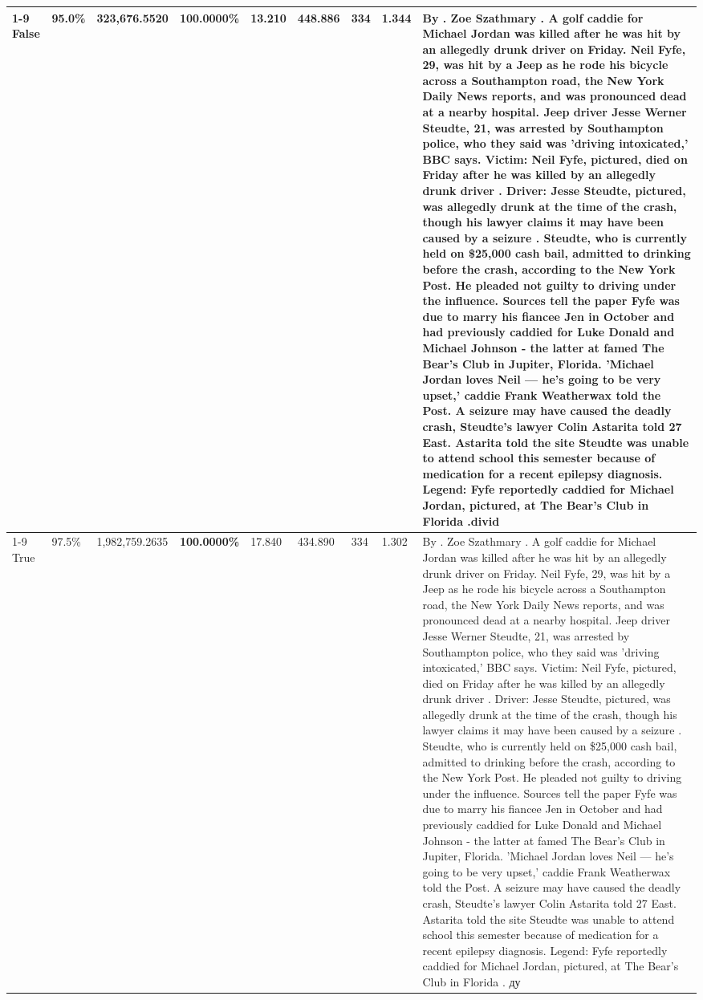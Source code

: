 \begin{table}[H]
\begin{tabular}{lllrlllll}
\cline{1-9}
False & 95.0\% & 323,676.5520 & \bfseries \color{red} 100.0000\% & 13.210 & 448.886 & 334 & 1.344 & By . Zoe Szathmary . A golf caddie for Michael Jordan was killed after he was hit by an allegedly drunk driver on Friday. Neil Fyfe, 29, was hit by a Jeep as he rode his bicycle across a Southampton road, the New York Daily News reports, and was pronounced dead at a nearby hospital. Jeep driver Jesse Werner Steudte, 21, was arrested by Southampton police, who they said was 'driving intoxicated,' BBC says. Victim: Neil Fyfe, pictured, died on Friday after he was killed by an allegedly drunk driver . Driver: Jesse Steudte, pictured, was allegedly drunk at the time of the crash, though his lawyer claims it may have been caused by a seizure . Steudte, who is currently held on \$25,000 cash bail, admitted to drinking before the crash, according to the New York Post. He pleaded not guilty to driving under the influence. Sources tell the paper Fyfe was due to marry his fiancee Jen in October and had previously caddied for Luke Donald and Michael Johnson - the latter at famed The Bear's Club in Jupiter, Florida. 'Michael Jordan loves Neil — he’s going to be very upset,' caddie Frank Weatherwax told the Post. A seizure may have caused the deadly crash, Steudte's lawyer Colin Astarita told 27 East. Astarita told the site Steudte was unable to attend school this semester because of medication for a recent epilepsy diagnosis. Legend: Fyfe reportedly caddied for Michael Jordan, pictured, at The Bear's Club in Florida .divid \\
\cline{1-9}
True & 97.5\% & 1,982,759.2635 & \bfseries \color{red} 100.0000\% & 17.840 & 434.890 & 334 & 1.302 & By . Zoe Szathmary . A golf caddie for Michael Jordan was killed after he was hit by an allegedly drunk driver on Friday. Neil Fyfe, 29, was hit by a Jeep as he rode his bicycle across a Southampton road, the New York Daily News reports, and was pronounced dead at a nearby hospital. Jeep driver Jesse Werner Steudte, 21, was arrested by Southampton police, who they said was 'driving intoxicated,' BBC says. Victim: Neil Fyfe, pictured, died on Friday after he was killed by an allegedly drunk driver . Driver: Jesse Steudte, pictured, was allegedly drunk at the time of the crash, though his lawyer claims it may have been caused by a seizure . Steudte, who is currently held on \$25,000 cash bail, admitted to drinking before the crash, according to the New York Post. He pleaded not guilty to driving under the influence. Sources tell the paper Fyfe was due to marry his fiancee Jen in October and had previously caddied for Luke Donald and Michael Johnson - the latter at famed The Bear's Club in Jupiter, Florida. 'Michael Jordan loves Neil — he’s going to be very upset,' caddie Frank Weatherwax told the Post. A seizure may have caused the deadly crash, Steudte's lawyer Colin Astarita told 27 East. Astarita told the site Steudte was unable to attend school this semester because of medication for a recent epilepsy diagnosis. Legend: Fyfe reportedly caddied for Michael Jordan, pictured, at The Bear's Club in Florida . ду \\

\end{tabular}
\end{table}
